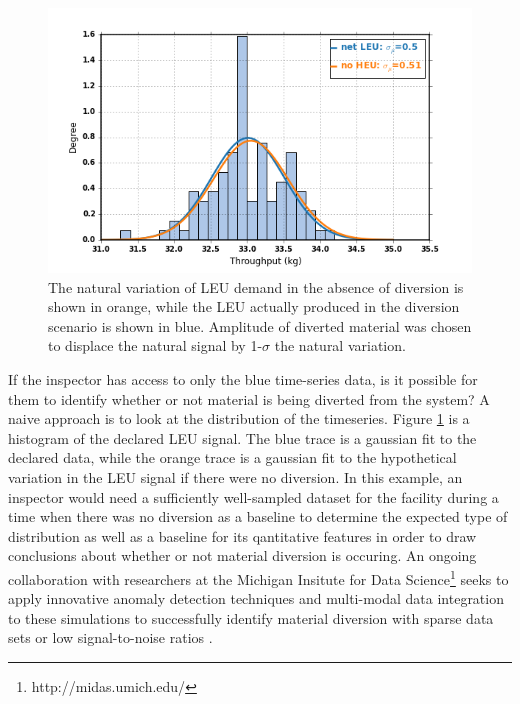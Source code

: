 \begin{figure}
\begin{center}
\includegraphics[natwidth=162bp,natheight=227bp, scale=0.7]{./figs/netLEU_hist_R5_new.png}
\end{center}
\caption{The natural variation of \gls{LEU} demand in the absence of diversion is shown in orange, while the \gls{LEU} actually produced in the diversion scenario is shown in blue. Amplitude of diverted material was chosen to displace the natural signal by 1-$\sigma$ the natural variation.}
\label{fig:leu_histogram}
\end{figure}

If the inspector has access to only the blue time-series data, is it possible for them to identify whether or not material is being diverted from the system?  A naive approach is to look at the distribution of the timeseries.  Figure \ref{fig:leu_histogram} is a histogram of the declared \gls{LEU} signal.  The blue trace is a gaussian fit to the declared data, while the orange trace is a gaussian fit to the hypothetical variation in the \gls{LEU} signal if there were no diversion.  In this example, an inspector would need a sufficiently well-sampled dataset for the facility during a time when there was no diversion as a baseline to determine the expected type of distribution as well as a baseline for its qantitative features in order to draw conclusions about whether or not material diversion is occuring. An ongoing collaboration with researchers at the Michigan Insitute for Data Science\footnote{http://midas.umich.edu/} seeks to apply innovative anomaly detection techniques and multi-modal data integration to these simulations to successfully identify material diversion with sparse data sets or low signal-to-noise ratios \cite{HERO_research}.






  